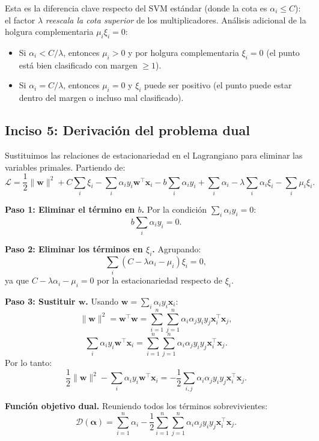 \documentclass[spanish]{article}
\begin{document}
Esta es la diferencia clave respecto del SVM estándar (donde la cota es $\alpha_i \leq C$): el factor $\lambda$ \emph{reescala la cota superior} de los multiplicadores. Análisis adicional de la holgura complementaria $\mu_i \xi_i = 0$:
\begin{itemize}
    \item Si $\alpha_i < C/\lambda$, entonces $\mu_i > 0$ y por holgura complementaria $\xi_i = 0$ (el punto está bien clasificado con margen $\geq 1$).
    \item Si $\alpha_i = C/\lambda$, entonces $\mu_i = 0$ y $\xi_i$ puede ser positivo (el punto puede estar dentro del margen o incluso mal clasificado).
\end{itemize}

\subsection{Inciso 5: Derivación del problema dual}

Sustituimos las relaciones de estacionariedad en el Lagrangiano para eliminar las variables primales. Partiendo de:
\[
\mathcal{L} = \frac{1}{2}\|\mathbf{w}\|^2 + C\sum_{i}\xi_i - \sum_{i}\alpha_i y_i \mathbf{w}^\top \mathbf{x}_i - b\sum_{i}\alpha_i y_i + \sum_{i}\alpha_i - \lambda\sum_{i}\alpha_i \xi_i - \sum_{i}\mu_i \xi_i.
\]

\textbf{Paso 1: Eliminar el término en $b$.} Por la condición $\sum_i \alpha_i y_i = 0$:
\[
b\sum_{i}\alpha_i y_i = 0.
\]

\textbf{Paso 2: Eliminar los términos en $\xi_i$.} Agrupando:
\[
\sum_{i}(C - \lambda\alpha_i - \mu_i)\xi_i = 0,
\]
ya que $C - \lambda\alpha_i - \mu_i = 0$ por la estacionariedad respecto de $\xi_i$.

\textbf{Paso 3: Sustituir $\mathbf{w}$.} Usando $\mathbf{w} = \sum_i \alpha_i y_i \mathbf{x}_i$:
\[
\|\mathbf{w}\|^2 = \mathbf{w}^\top \mathbf{w} = \sum_{i=1}^{n}\sum_{j=1}^{n}\alpha_i \alpha_j y_i y_j \mathbf{x}_i^\top \mathbf{x}_j,
\]
\[
\sum_{i}\alpha_i y_i \mathbf{w}^\top \mathbf{x}_i = \sum_{i=1}^{n}\sum_{j=1}^{n}\alpha_i \alpha_j y_i y_j \mathbf{x}_i^\top \mathbf{x}_j.
\]
Por lo tanto:
\[
\frac{1}{2}\|\mathbf{w}\|^2 - \sum_{i}\alpha_i y_i \mathbf{w}^\top \mathbf{x}_i = -\frac{1}{2}\sum_{i,j}\alpha_i \alpha_j y_i y_j \mathbf{x}_i^\top \mathbf{x}_j.
\]

\textbf{Función objetivo dual.} Reuniendo todos los términos sobrevivientes:
\begin{equation}
\boxed{\;
\mathcal{D}(\boldsymbol{\alpha}) = \sum_{i=1}^{n}\alpha_i - \frac{1}{2}\sum_{i=1}^{n}\sum_{j=1}^{n}\alpha_i \alpha_j y_i y_j \mathbf{x}_i^\top \mathbf{x}_j.
\;}
\end{equation}
\end{document}

